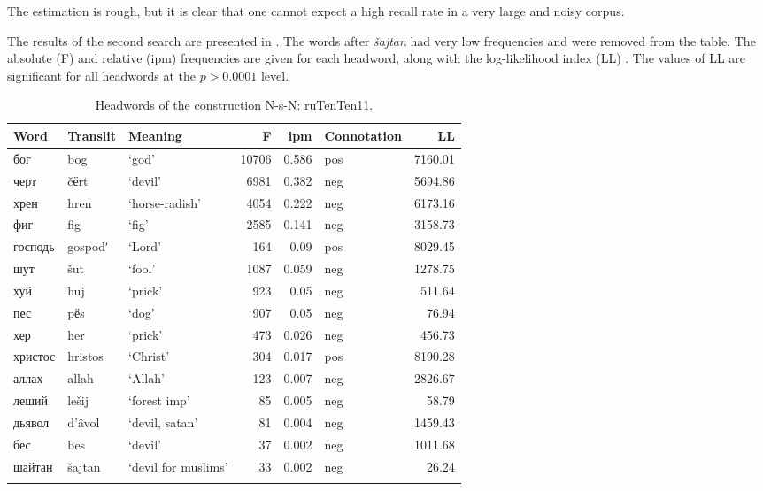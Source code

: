 \documentclass[output=paper]{langscibook}
\begin{document}
The estimation is rough, but it is clear that one cannot expect a high recall rate in a very large and noisy corpus. 

The results of the second search are presented in . The words after \textit{šajtan} had very low frequencies and were removed from the table. The absolute (F) and relative (ipm) frequencies are given for each headword, along with the log-likelihood index (LL) \parencites{Dunning1993}[111]{Xiao2015}[223--239]{Levshina2015}. The values of LL are significant for all headwords at the $p>0.0001$ level.


\begin{table}
\begin{tabularx}{\textwidth}{XXl rrXr}
\lsptoprule
{Word} & {Translit} & {Meaning} & {F} & {ipm} & {Connotation} & {LL}\\
\midrule
{{бог}} & {bog} & {‘god’} & {10706} & {0.586} & {pos} & {7160.01}\\
{{черт}} & {č{ёrt}} & {‘devil’} & {6981} & {0.382} & {neg} & {5694.86}\\
{{хрен}} & {hren} & {‘horse-radish’} & {4054} & {0.222} & {neg} & {6173.16}\\
{{фиг}} & {fig} & {‘fig’} & {2585} & {0.141} & {neg} & {3158.73}\\
{{господь}} & {gospodʹ} & {‘Lord’} & {164} & {0.09} & {pos} & {8029.45}\\
{{шут}} & {šut} & {‘fool’} & {1087} & {0.059} & {neg} & {1278.75}\\
{{хуй}} & {huj} & {‘prick’} & {923} & {0.05} & {neg} & {511.64}\\
{{пес}} & {p{ёs}} & {‘dog’} & {907} & {0.05} & {neg} & {76.94}\\
{{хер}} & {her} & {‘prick’} & {473} & {0.026} & {neg} & {456.73}\\
{{христос}} & {hristos} & {‘Christ’} & {304} & {0.017} & {pos} & {8190.28}\\
{{аллах}} & {allah} & {‘Allah’} & {123} & {0.007} & {neg} & {2826.67}\\
{{леший}} & {lešij} & {‘forest imp’} & {85} & {0.005} & {neg} & {58.79}\\
{{дьявол}} & {d’âvol} & {‘devil, satan’} & {81} & {0.004} & {neg} & {1459.43}\\
{{бес}} & {bes} & {‘devil’} & {37} & {0.002} & {neg} & {1011.68}\\
{{шайтан}} & {šajtan} & {‘devil for muslims’} & {33} & {0.002} & {neg} & {26.24}\\
\lspbottomrule
\end{tabularx}
\caption{Headwords of the construction N-s-N: ruTenTen11.\label{tab:mikhailov:2}}
\end{table}
\end{document}

